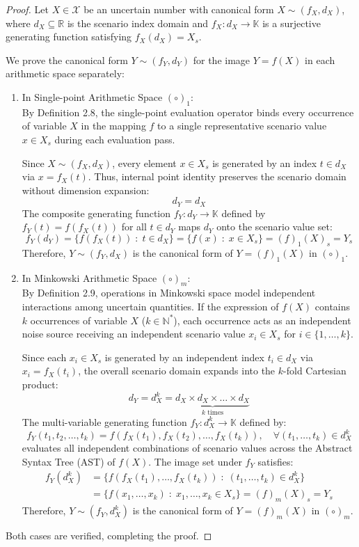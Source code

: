 \documentclass[a4paper,12pt,twoside]{memoir}
\newcommand{\kgdd}[1]{\left(#1\right)_1} %
\newcommand{\kgdt}[1]{\left(#1\right)_m} %
\begin{document}
	\begin{proof}
		Let $X \in \mathcal{X}$ be an uncertain number with canonical form $X \sim (f_X, d_X)$, where $d_X \subseteq \mathbb{R}$ is the scenario index domain and $f_X: d_X \to \mathbb{K}$ is a surjective generating function satisfying $f_X(d_X) = X_s$.
		
		We prove the canonical form $Y \sim (f_Y, d_Y)$ for the image $Y = f(X)$ in each arithmetic space separately:
		
		\begin{enumerate}[leftmargin=*]
			\item In Single-point Arithmetic Space $(\circ)_1$: \\
			By Definition 2.8, the single-point evaluation operator binds every occurrence of variable $X$ in the mapping $f$ to a single representative scenario value $x \in X_s$ during each evaluation pass.
			
			Since $X \sim (f_X, d_X)$, every element $x \in X_s$ is generated by an index $t \in d_X$ via $x = f_X(t)$. Thus, internal point identity preserves the scenario domain without dimension expansion:
			\[
			d_Y = d_X
			\]
			The composite generating function $f_Y : d_Y \to \mathbb{K}$ defined by $f_Y(t) = f(f_X(t))$ for all $t \in d_Y$ maps $d_Y$ onto the scenario value set:
			\[
			f_Y(d_Y) = \{f(f_X(t)) \;:\; t \in d_X\} = \{f(x) \;:\; x \in X_s\} = \kgdd{f}(X)_s = Y_s
			\]
			Therefore, $Y \sim (f_Y, d_X)$ is the canonical form of $Y = \kgdd{f}(X)$ in $(\circ)_1$.
			
			\item In Minkowski Arithmetic Space $(\circ)_m$: \\
			By Definition 2.9, operations in Minkowski space model independent interactions among uncertain quantities. If the expression of $f(X)$ contains $k$ occurrences of variable $X$ ($k \in \mathbb{N}^*$), each occurrence acts as an independent noise source receiving an independent scenario value $x_i \in X_s$ for $i \in \{1, \dots, k\}$.
			
			Since each $x_i \in X_s$ is generated by an independent index $t_i \in d_X$ via $x_i = f_X(t_i)$, the overall scenario domain expands into the $k$-fold Cartesian product:
			\[
			d_Y = d_X^k = \underbrace{d_X \times d_X \times \dots \times d_X}_{k \text{ times}}
			\]
			The multi-variable generating function $f_Y : d_X^k \to \mathbb{K}$ defined by:
			\[
			f_Y(t_1, t_2, \dots, t_k) = f\left(f_X(t_1), f_X(t_2), \dots, f_X(t_k)\right), \quad \forall (t_1, \dots, t_k) \in d_X^k
			\]
			evaluates all independent combinations of scenario values across the Abstract Syntax Tree (AST) of $f(X)$. The image set under $f_Y$ satisfies:
			\begin{align*}
				f_Y(d_X^k) & = \{f\left(f_X(t_1), \dots, f_X(t_k)\right) \;:\; (t_1, \dots, t_k) \in d_X^k\} \\
				& = \{f(x_1, \dots, x_k) \;:\; x_1, \dots, x_k \in X_s\} = \kgdt{f}(X)_s = Y_s
			\end{align*}
			Therefore, $Y \sim (f_Y, d_X^k)$ is the canonical form of $Y = \kgdt{f}(X)$ in $(\circ)_m$.
		\end{enumerate}
		
		Both cases are verified, completing the proof.
	\end{proof}
\end{document}
